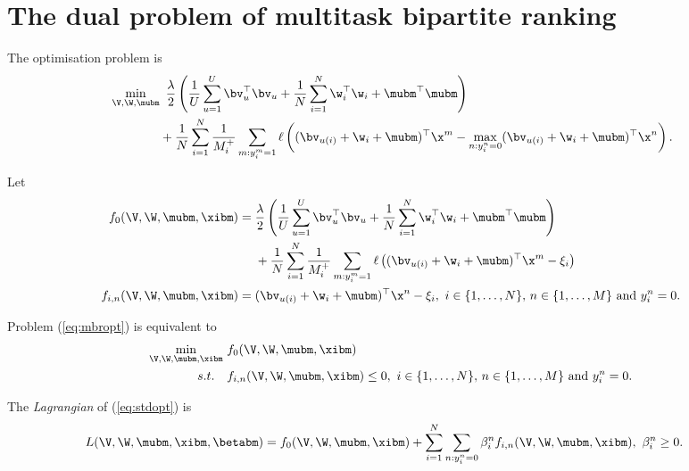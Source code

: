 \section{The dual problem of multitask bipartite ranking}

The optimisation problem is
\begin{equation}
\label{eq:mbropt}
\begin{aligned}
&\min_{\V, \W, \mubm} \ \frac{\lambda}{2} \left( \frac{1}{U} \sum_{u=1}^U \bv_u^\top \bv_u 
     + \frac{1}{N} \sum_{i=1}^N \w_i^\top \w_i + \mubm^\top \mubm \right) \\
& \hspace{4em}
     + \frac{1}{N} \sum_{i=1}^N \frac{1}{M_i^+} \sum_{m: y_i^m = 1} \ell \left( (\bv_{u(i)} + \w_i + \mubm)^\top \x^m 
     - \max_{n: y_i^n = 0} (\bv_{u(i)} + \w_i + \mubm)^\top \x^n \right).
\end{aligned}
\end{equation}

Let 
\begin{equation*}
\begin{aligned}
f_0(\V, \W, \mubm, \xibm) &= \frac{\lambda}{2} \left( \frac{1}{U} \sum_{u=1}^U \bv_u^\top \bv_u 
     + \frac{1}{N} \sum_{i=1}^N \w_i^\top \w_i + \mubm^\top \mubm \right) \\
& \quad \ 
     + \frac{1}{N} \sum_{i=1}^N \frac{1}{M_i^+} \sum_{m: y_i^m = 1} 
       \ell \left( (\bv_{u(i)} + \w_i + \mubm)^\top \x^m - \xi_i \right) \\
f_{i,n} (\V, \W, \mubm, \xibm) &= (\bv_{u(i)} + \w_i + \mubm)^\top \x^n - \xi_i, \
i \in \{1,\dots,N\}, \, n \in \{1,\dots,M\} \ \mathrm{and} \ y_i^n = 0.
\end{aligned}
\end{equation*}

Problem (\ref{eq:mbropt}) is equivalent to 
\begin{equation}
\label{eq:stdopt}
\begin{aligned}
\min_{\V, \W, \mubm, \xibm} \ & f_0(\V, \W, \mubm, \xibm) \\
s.t. \quad & f_{i,n}(\V, \W, \mubm, \xibm) \le 0, \
i \in \{1,\dots,N\}, \, n \in \{1,\dots,M\} \ \mathrm{and} \ y_i^n = 0.
\end{aligned}
\end{equation}

The \emph{Lagrangian} of (\ref{eq:stdopt}) is
\begin{equation*}
\begin{aligned}
L(\V, \W, \mubm, \xibm, \betabm) 
&= f_0(\V, \W, \mubm, \xibm) + \sum_{i=1}^N \sum_{n: y_i^n = 0} \beta_i^n f_{i,n} (\V, \W, \mubm, \xibm), \
\beta_i^n \ge 0.
\end{aligned}
\end{equation*}

